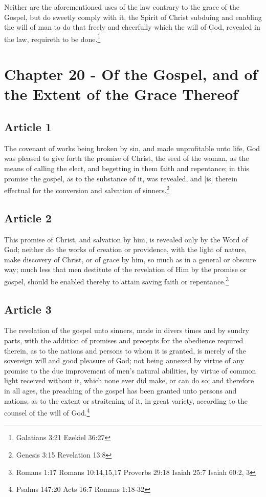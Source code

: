 \documentclass[12pt,letterpaper]{book}
\begin{document}
Neither are the aforementioned uses of the law contrary to the grace of the Gospel, but do sweetly comply with it, the Spirit of Christ subduing and enabling the will of man to do that freely and cheerfully which the will of God, revealed in the law, requireth to be done.\footnote{Galatians 3:21 Ezekiel 36:27}

\chapter{Chapter 20 - Of the Gospel, and of the Extent of the Grace Thereof}
\section{Article 1}

The covenant of works being broken by sin, and made unprofitable unto life, God was pleased to give forth the promise of Christ, the seed of the woman, as the means of calling the elect, and begetting in them faith and repentance; in this promise the gospel, as to the substance of it, was revealed, and [is] therein effectual for the conversion and salvation of sinners.\footnote{Genesis 3:15 Revelation 13:8}

\section{Article 2}

This promise of Christ, and salvation by him, is revealed only by the Word of God; neither do the works of creation or providence, with the light of nature, make discovery of Christ, or of grace by him, so much as in a general or obscure way; much less that men destitute of the revelation of Him by the promise or gospel, should be enabled thereby to attain saving faith or repentance.\footnote{Romans 1:17 Romans 10:14,15,17 Proverbs 29:18 Isaiah 25:7 Isaiah 60:2, 3}

\section{Article 3}

The revelation of the gospel unto sinners, made in divers times and by sundry parts, with the addition of promises and precepts for the obedience required therein, as to the nations and persons to whom it is granted, is merely of the sovereign will and good pleasure of God; not being annexed by virtue of any promise to the due improvement of men's natural abilities, by virtue of common light received without it, which none ever did make, or can do so; and therefore in all ages, the preaching of the gospel has been granted unto persons and nations, as to the extent or straitening of it, in great variety, according to the counsel of the will of God.\footnote{Psalms 147:20 Acts 16:7 Romans 1:18-32}
\end{document}
